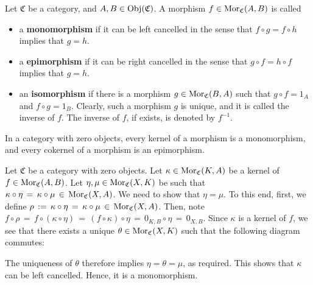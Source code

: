 \vskip 0.5cm
\begin{definition}
\mbox{}
\vskip 0.1cm
\noindent
Let $\mathfrak{C}$ be a category, and $A, B \in \textnormal{Obj}(\mathfrak{C})$.
A morphism $f \in \textnormal{Mor}_{\mathfrak{C}}(A,B)$ is called
\begin{itemize}
\item
	a \textbf{monomorphism} if it can be {\color{red}left} cancelled in the sense that
	$f \circ g = f \circ h$  implies that $g = h$.
\item
	a \textbf{epimorphism} if it can be {\color{red}right} cancelled in the sense that
	$g \circ f = h \circ f$  implies that $g = h$.
\item
	an \textbf{isomorphism} if there is a morphism $g \in \textnormal{Mor}_{\mathfrak{C}}(B,A)$
	such that $g \circ f = 1_{A}$ and $f \circ g = 1_{B}$.
	Clearly, such a morphism $g$ is unique, and it is called the inverse of $f$.
	The inverse of $f$, if exists, is denoted by $f^{-1}$.
\end{itemize}
\end{definition}


\vskip 0.5cm
\begin{proposition}
\mbox{}
\vskip 0.1cm
\noindent
In a category with zero objects, every kernel of a morphism is a monomorphism, and
every cokernel of a morphism is an epimorphism.
\end{proposition}
\proof
Let $\mathfrak{C}$ be a category with zero objects.
Let $\kappa \in \textnormal{Mor}_{\mathfrak{C}}(K,A)$ be a kernel of $f \in \textnormal{Mor}_{\mathfrak{C}}(A,B)$.
Let $\eta, \mu \in \textnormal{Mor}_{\mathfrak{C}}(X,K)$ be such that
$\kappa \circ \eta \,=\, \kappa \circ \mu \,\in\, \textnormal{Mor}_{\mathfrak{C}}(X,A)$.
We need to show that $\eta = \mu$.
To this end, first, we define $\rho \,:=\, \kappa \circ \eta \,=\, \kappa \circ \mu \,\in\, \textnormal{Mor}_{\mathfrak{C}}(X,A)$.
Then, note
$f \circ \rho \,=\, f \circ (\kappa \circ \eta) \,=\, (f \circ \kappa) \circ \eta \,=\, 0_{K,B} \circ \eta \,=\, 0_{X,B}$.
Since $\kappa$ is a kernel of $f$, we see that there exists a unique $\theta \in \textnormal{Mor}_{\mathfrak{C}}(X,K)$ such that
the following diagram commutes:
\begin{center}
\end{center}
The uniqueness of $\theta$ therefore implies $\eta = \theta = \mu$, as required.
This shows that $\kappa$ can be left cancelled.
Hence, it is a monomorphism.

